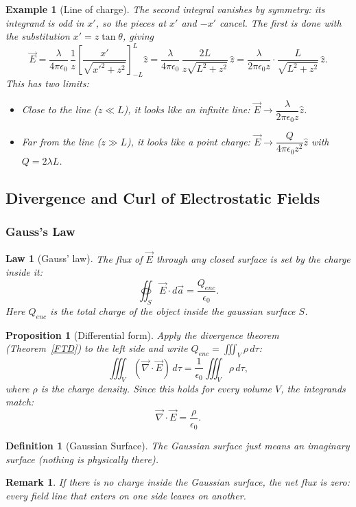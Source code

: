 \documentclass{article}
\newtheorem{law}{Law}
\newtheorem{definition}{Definition}
\newtheorem*{example}{Example}
\newtheorem{remark}{Remark}
\newtheorem{proposition}{Proposition}
\begin{document}
\begin{example}[Line of charge]
    The second integral vanishes by symmetry: its integrand is odd in $x'$, so the pieces at $x'$ and $-x'$ cancel. The first is done with the substitution $x' = z\tan\theta$, giving
    \[\vec{E} = \frac{\lambda}{4\pi\epsilon_0}\,\frac{1}{z}\left[\frac{x'}{\sqrt{x'^2+z^2}}\right]_{-L}^{L}\hat{z} = \frac{\lambda}{4\pi\epsilon_0}\,\frac{2L}{z\sqrt{L^2+z^2}}\,\hat{z} = \frac{\lambda}{2\pi\epsilon_0 z}\cdot\frac{L}{\sqrt{L^2 + z^2}}\,\hat{z}.\]
    This has two limits:
    \begin{itemize}
        \item Close to the line ($z \ll L$), it looks like an infinite line: $\vec{E} \to \dfrac{\lambda}{2\pi\epsilon_0 z}\hat{z}$.
        \item Far from the line ($z \gg L$), it looks like a point charge: $\vec{E} \to \dfrac{Q}{4\pi\epsilon_0 z^2}\hat{z}$ with $Q = 2\lambda L$.
    \end{itemize}
\end{example}

\subsection{Divergence and Curl of Electrostatic Fields}

\subsubsection{Gauss's Law}
\begin{law}[Gauss' law]
    The flux of $\vec{E}$ through any closed surface is set by the charge inside it:
    \begin{equation}
        \label{eq:gauss}
        \oiint_S \vec{E}\cdot d\vec{a} = \frac{Q_{enc}}{\epsilon_0}.
    \end{equation}
    Here $Q_{enc}$ is the total charge of the object inside the gaussian surface $S$.
\end{law}

\begin{proposition}[Differential form]
    Apply the divergence theorem (Theorem~\ref{FTD}) to the left side and write $Q_{enc} = \iiint_V\rho\,d\tau$:
    \[\iiint_V(\vec{\nabla}\cdot\vec{E})\,d\tau = \frac{1}{\epsilon_0}\iiint_V \rho\,d\tau,\]
    where $\rho$ is the charge density. Since this holds for every volume $V$, the integrands match:
    \begin{equation}
        \vec{\nabla}\cdot\vec{E} = \frac{\rho}{\epsilon_0}.
    \end{equation}
\end{proposition}
\begin{definition}[Gaussian Surface]
    The Gaussian surface just means an imaginary surface (nothing is physically there).
\end{definition}
\begin{remark}
    If there is no charge inside the Gaussian surface, the net flux is zero: every field line that enters on one side leaves on another.
\end{remark}
\end{document}
